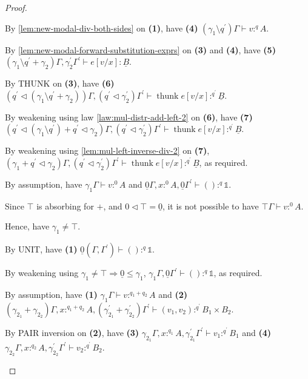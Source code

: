 \documentclass[acmsmall,screen,nonacm]{acmart}
\DeclareMathOperator{\thunk}{\text{thunk}}
\newcommand{\unit}{\mathbb{1}}
\newcommand{\tee}{\vdash}
\DeclareMathOperator{\scale}{\mathbin{\triangleleft}}
\begin{document}
\begin{proof}
\begin{description}
    By \ref{lem:new-modal-div-both-sides} on \textbf{(1)}, have \textbf{(4)} $(\gamma_1 \setminus q^\prime)\Gamma \tee v :^q A$.

    By \ref{lem:new-modal-forward-substitution-exprs} on \textbf{(3)} and \textbf{(4)}, have \textbf{(5)} $(\gamma_1 \setminus q^\prime + \gamma_2)\Gamma, \gamma_2^\prime\Gamma^\prime \tee e[v/x] : \underline{B}$.

    By THUNK on \textbf{(3)}, have \textbf{(6)} $(q^\prime \scale (\gamma_1 \setminus q^\prime + \gamma_2))\Gamma, (q^\prime \scale \gamma_2^\prime)\Gamma^\prime \tee \thunk e[v/x] :^{q^\prime} \underline{B}$.

    By weakening using law \ref{law:mul-distr-add-left-2} on \textbf{(6)}, have \textbf{(7)} $(q^\prime \scale (\gamma_1 \setminus q^\prime) + q^\prime \scale \gamma_2)\Gamma, (q^\prime \scale \gamma_2^\prime)\Gamma^\prime \tee \thunk e[v/x] :^{q^\prime} \underline{B}$.

    By weakening using \ref{lem:mul-left-inverse-div-2} on \textbf{(7)}, $(\gamma_1 + q^\prime \scale \gamma_2)\Gamma, (q^\prime \scale \gamma_2^\prime)\Gamma^\prime \tee \thunk e[v/x] :^{q^\prime} \underline{B}$, as required.
    \\
    \item[Case UNIT.]
    By assumption, have $\gamma_1\Gamma \tee v :^0 A$ and $\underline{0}\Gamma, x :^0 A, \underline{0}\Gamma^\prime \tee () :^q \unit$.

    Since $\top$ is absorbing for $+$, and $0 \scale \top = \underline{0}$, it is not possible to have $\top\Gamma \tee v :^0 A$.

    Hence, have $\gamma_1 \ne \top$.

    By UNIT, have \textbf{(1)} $\underline{0}(\Gamma, \Gamma^\prime) \tee () :^q \unit$.

    By weakening using $\gamma_1 \ne \top \Rightarrow \underline{0} \le \gamma_1$, $\gamma_1\Gamma, \underline{0}\Gamma^\prime \tee () :^q \unit$, as required.
    \\
    \item[Case PAIR.]
    By assumption, have \textbf{(1)} $\gamma_1\Gamma \tee v :^{q_1 + q_2} A$ and \textbf{(2)} $(\gamma_{2_1} + \gamma_{2_2})\Gamma, x :^{q_1 + q_2} A, (\gamma_{2_1}^\prime + \gamma_{2_2}^\prime)\Gamma^\prime \tee (v_1, v_2) :^{q^\prime} B_1 \times B_2$. 

    By PAIR inversion on \textbf{(2)}, have \textbf{(3)} $\gamma_{2_1}\Gamma, x :^{q_1} A, \gamma_{2_1}^\prime\Gamma^\prime \tee v_1 :^{q^\prime} B_1$ and \textbf{(4)} $\gamma_{2_2}\Gamma, x :^{q_2} A, \gamma_{2_2}^\prime\Gamma^\prime \tee v_2 :^{q^\prime} B_2$.


\end{description}
\end{proof}
\end{document}
